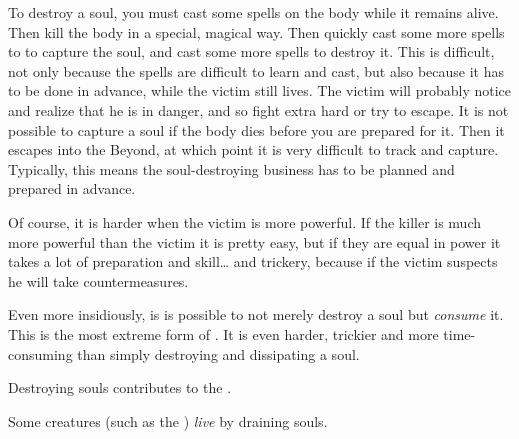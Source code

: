 To destroy a soul, you must cast some spells on the body while it remains alive.
Then kill the body in a special, magical way. 
Then quickly cast some more spells to to capture the soul, and cast some more spells to destroy it. 
This is difficult, not only because the spells are difficult to learn and cast, but also because it has to be done in advance, while the victim still lives. 
The victim will probably notice and realize that he is in danger, and so fight extra hard or try to escape. 
It is not possible to capture a soul if the body dies before you are prepared for it. 
Then it escapes into the Beyond, at which point it is very difficult to track and capture. 
Typically, this means the soul-destroying business has to be planned and prepared in advance. 

Of course, it is harder when the victim is more powerful. 
If the killer is much more powerful than the victim it is pretty easy, but if they are equal in power it takes a lot of preparation and skill\ldots{} and trickery, because if the victim suspects he will take countermeasures. 

Even more insidiously, is is possible to not merely destroy a soul but \emph{consume} it. 
This is the most extreme form of . 
It is even harder, trickier and more time-consuming than simply destroying and dissipating a soul. 

Destroying souls contributes to the . 

Some creatures (such as the ) \emph{live} by draining souls. 






